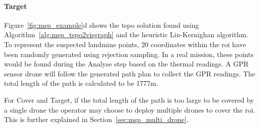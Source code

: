 \paragraph{Target} Figure~\ref{fig:msp_example}d shows the \gls{tspo} solution found using Algorithm~\ref{alg:msp_tspo2visgraph} and the heuristic Lin-Kernighan algorithm. To represent the suspected landmine points, 20 coordinates within the \gls{roi} have been randomly generated using rejection sampling. In a real mission, these points would be found during the Analyse step based on the thermal readings. A \gls{GPR} sensor drone will follow the generated path plan to collect the \gls{GPR} readings. The total length of the path is calculated to be 1777m.

For Cover and Target, if the total length of the path is too large to be covered by a single drone the operator may choose to deploy multiple drones to cover the \gls{roi}. This is further explained in Section~\ref{sec:msp_multi_drone}. 


